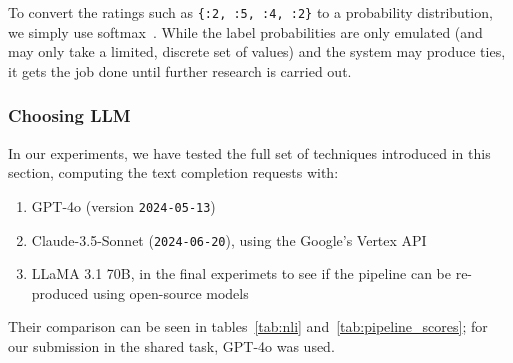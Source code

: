 To convert the ratings such as \texttt{\{:2, :5, :4, :2\}} to a probability distribution, we simply use softmax~\cite{NIPS1989_0336dcba}.
While the label probabilities are only emulated (and may only take a limited, discrete set of values) and the system may produce ties, it gets the job done until further research is carried out.

\subsubsection{Choosing LLM}
\label{sec:chosen_llms}
In our experiments, we have tested the full set of techniques introduced in this section, computing the text completion requests with:
\begin{enumerate}
    \item GPT-4o (version \texttt{2024-05-13})
    \item Claude-3.5-Sonnet (\texttt{2024-06-20}), using the Google's Vertex API
    \item LLaMA 3.1 70B, in the final experimets to see if the pipeline can be re-produced using open-source models
\end{enumerate} 

Their comparison can be seen in tables~\ref{tab:nli} and~\ref{tab:pipeline_scores}; for our submission in the \averitec{}  shared task, GPT-4o was used.